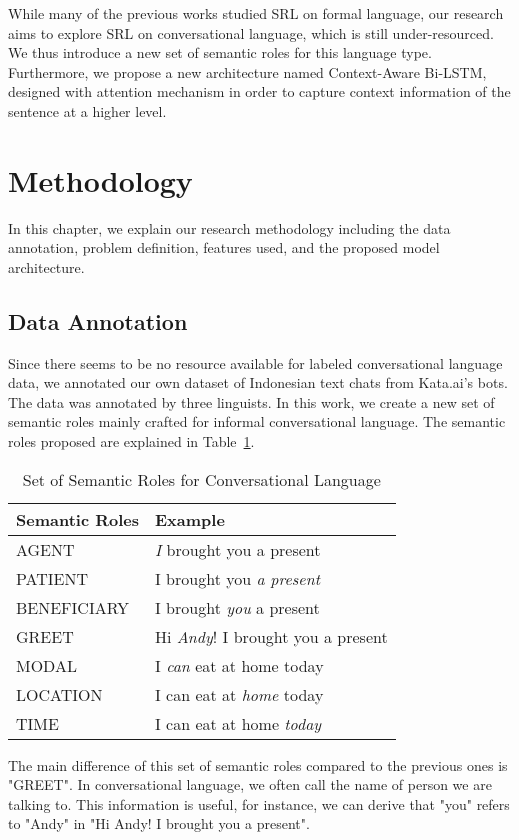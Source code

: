 While many of the previous works studied SRL on formal language, our research aims to explore SRL on conversational language, which is still under-resourced. We thus introduce a new set of semantic roles for this language type. Furthermore, we propose a new architecture named Context-Aware Bi-LSTM, designed with attention mechanism in order to capture context information of the sentence at a higher level.

\section{Methodology}
In this chapter, we explain our research methodology including the data annotation, problem definition, features used, and the proposed model architecture.

\subsection{Data Annotation}
Since there seems to be no resource available for labeled conversational language data, we annotated our own dataset of Indonesian text chats from Kata.ai’s bots. The data was annotated by three linguists. In this work, we create a new set of semantic roles mainly crafted for informal conversational language. The semantic roles proposed are explained in Table~\ref{tab:semantic_roles}.

\begin{table}
	\caption{Set of Semantic Roles for Conversational Language}
	\label{tab:semantic_roles}
	\begin{tabular}{ll}
		\toprule
		Semantic Roles		&Example\\
		\midrule
		AGENT				& \emph{I} brought you a present\\
		PATIENT				& I brought you \emph{a present}\\
		BENEFICIARY			& I brought \emph{you} a present\\
		GREET 				& Hi \emph{Andy}! I brought you a present\\
		MODAL 				& I \emph{can} eat at home today \\
		LOCATION 			& I can eat at \emph{home} today \\
		TIME 				& I can eat at home \emph{today} \\
		\bottomrule
	\end{tabular}
\end{table}

The main difference of this set of semantic roles compared to the previous ones is "GREET". In conversational language, we often call the name of person we are talking to. This information is useful, for instance, we can derive that "you" refers to "Andy" in "Hi Andy! I brought you a present".

